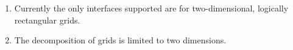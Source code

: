 

\begin{enumerate}

\item Currently the only interfaces supported are for two-dimensional, 
logically rectangular grids. 

\item The decomposition of grids is limited to two dimensions.

\end{enumerate}


